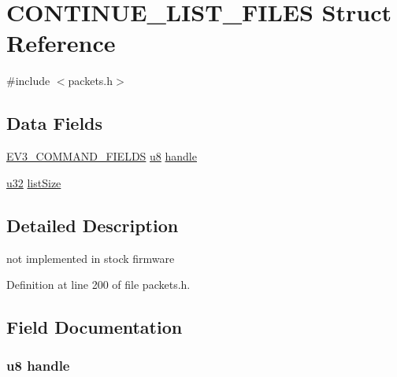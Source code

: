 \hypertarget{struct_c_o_n_t_i_n_u_e___l_i_s_t___f_i_l_e_s}{}\section{C\+O\+N\+T\+I\+N\+U\+E\+\_\+\+L\+I\+S\+T\+\_\+\+F\+I\+L\+E\+S Struct Reference}
\label{struct_c_o_n_t_i_n_u_e___l_i_s_t___f_i_l_e_s}


{\ttfamily \#include $<$packets.\+h$>$}

\subsection*{Data Fields}
\begin{DoxyCompactItemize}
\item 
\hyperlink{packets_8h_a0c26a010ef0da2962a751796943824c9}{E\+V3\+\_\+\+C\+O\+M\+M\+A\+N\+D\+\_\+\+F\+I\+E\+L\+D\+S} \hyperlink{defs_8h_a92c50087ca0e64fa93fc59402c55f8ca}{u8} \hyperlink{struct_c_o_n_t_i_n_u_e___l_i_s_t___f_i_l_e_s_aa51e1209e753b36d7bd2fd25e49a348d}{handle}
\item 
\hyperlink{defs_8h_afaa62991928fb9fb18ff0db62a040aba}{u32} \hyperlink{struct_c_o_n_t_i_n_u_e___l_i_s_t___f_i_l_e_s_abfa15b3e9c94f60be2f38c77d1dbe5ae}{list\+Size}
\end{DoxyCompactItemize}


\subsection{Detailed Description}
not implemented in stock firmware 

Definition at line 200 of file packets.\+h.



\subsection{Field Documentation}
\hypertarget{struct_c_o_n_t_i_n_u_e___l_i_s_t___f_i_l_e_s_aa51e1209e753b36d7bd2fd25e49a348d}{}
\subsubsection[{handle}]{ {\bf u8} handle}\label{struct_c_o_n_t_i_n_u_e___l_i_s_t___f_i_l_e_s_aa51e1209e753b36d7bd2fd25e49a348d}


